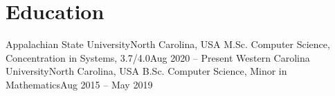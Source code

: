 \section{Education}
  \resumeSubHeadingListStart
    \resumeSubheading
      {Appalachian State University}{North Carolina, USA}
      {M.Sc. Computer Science, Concentration in Systems, 3.7/4.0}{Aug 2020 -- Present}
      \resumeItemListStart
      \resumeItemListEnd
    \resumeSubheading
      {Western Carolina University}{North Carolina, USA}
      {B.Sc. Computer Science, Minor in Mathematics}{Aug 2015 -- May 2019}
      \resumeItemListStart
      \resumeItemListEnd
  \resumeSubHeadingListEnd